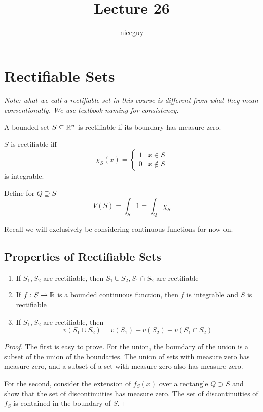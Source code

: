 \documentclass[12pt]{article}
\title{Lecture 26}
\author{niceguy}
\begin{document}
\maketitle

\section{Rectifiable Sets}

\textit{Note: what we call a rectifiable set in this course is different from what they mean conventionally. We use textbook naming for consistency.}

\begin{defn}
    A bounded set $S \subseteq \mathbb{R}^n$ is rectifiable if  its boundary has measure zero.
\end{defn}

\begin{rem}
    $S$ is rectifiable iff
    $$\chi_S(x) = \begin{cases} 1 & x \in S \\ 0 & x \notin S \end{cases}$$
    is integrable.
\end{rem}

Define for $Q \supseteq S$
$$V(S) = \int_S 1 = \int_Q \chi_S$$

Recall we will exclusively be considering continuous functions for now on.

\subsection{Properties of Rectifiable Sets}

\begin{enumerate}
    \item If $S_1, S_2$ are rectifiable, then $S_1 \cup S_2, S_1 \cap S_2$ are rectifiable
    \item If $f:S \rightarrow \mathbb{R}$ is a bounded continuous function, then $f$ is integrable and $S$ is rectifiable
    \item If $S_1,S_2$ are rectifiable, then
        $$v(S_1 \cup S_2) = v(S_1) + v(S_2) - v(S_1 \cap S_2)$$
\end{enumerate}

\begin{proof}
The first is easy to prove. For the union, the boundary of the union is a subset of the union of the boundaries. The union of sets with measure zero has measure zero, and a subset of a set with measure zero also has measure zero.

For the second, consider the extension of $f_S(x)$ over a rectangle $Q \supset S$ and show that the set of discontinuities has measure zero. The set of discontinuities of $f_S$ is contained in the boundary of $S$.
\end{proof}
\end{document}
